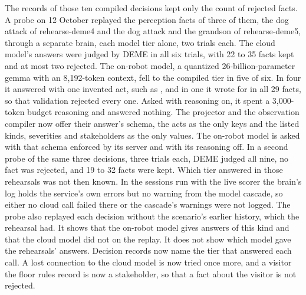 The records of those ten compiled decisions kept only the count of rejected facts.
A probe on 12 October replayed the perception facts of three of them, the dog attack of
rehearse-deme4 and the dog attack and the grandson of rehearse-deme5, through a separate brain,
each model tier alone, two trials each.
The cloud model's answers were judged by DEME in all six trials, with 22 to 35 facts kept and at
most two rejected.
The on-robot model, a quantized 26-billion-parameter gemma with an 8,192-token context, fell to the
compiled tier in five of six.
In four it answered with one invented act, such as , and in one it wrote
 for  in all 29 facts, so that validation rejected every one.
Asked with reasoning on, it spent a 3,000-token budget reasoning and answered nothing.
The projector and the observation compiler now offer their answer's schema, the acts as the only
keys and the listed kinds, severities and stakeholders as the only values.
The on-robot model is asked with that schema enforced by its server and with its reasoning off.
In a second probe of the same three decisions, three trials each, DEME judged all nine, no fact was
rejected, and 19 to 32 facts were kept.
Which tier answered in those rehearsals was not then known.
In the sessions run with the live scorer the brain's log holds the service's own errors but no
warning from the model cascade, so either no cloud call failed there or the cascade's warnings were
not logged.
The probe also replayed each decision without the scenario's earlier history, which the rehearsal
had.
It shows that the on-robot model gives answers of this kind and that the cloud model did not on the
replay. It does not show which model gave the rehearsals' answers.
Decision records now name the tier that answered each call.
A lost connection to the cloud model is now tried once more, and a visitor the floor rules record is
now a stakeholder, so that a fact about the visitor is not rejected.

